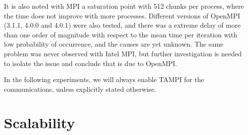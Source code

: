 It is also noted with MPI a saturation point with 512 chunks per process, where 
the time does not improve with more processes. Different versions of OpenMPI 
(3.1.1, 4.0.0 and 4.0.1) were also tested, and there was a extreme delay of more 
than one order of magnitude with respect to the mean time per iteration with low 
probability of occurrence, and the causes are yet unknown. The same problem was 
never observed with Intel MPI, but further investigation is needed to isolate 
the issue and conclude that is due to OpenMPI.

In the following experiments, we will always enable TAMPI for the 
communications, unless explicitly stated otherwise.

\section{Scalability}

